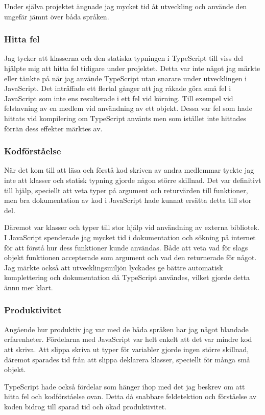 Under själva projektet ängnade jag mycket tid åt utveckling och använde den ungefär jämnt över båda språken.
\subsubsection{Hitta fel}
Jag tycker att klasserna och den statiska typningen i TypeScript till viss del hjälpte mig att hitta fel tidigare under projektet. Detta var inte något jag märkte eller tänkte på när jag använde TypeScript utan snarare under utvecklingen i JavaScript. Det inträffade ett flertal gånger att jag råkade göra små fel i JavaScript som inte ens resulterade i ett fel vid körning. Till exempel vid felstavning av en medlem vid användning av ett objekt. Dessa var fel som hade hittats vid kompilering om TypeScript använts men som istället inte hittades förrän dess effekter märktes av.
\subsubsection{Kodförståelse}
När det kom till att läsa och förstå kod skriven av andra medlemmar tyckte jag inte att klasser och statisk typning gjorde någon större skillnad. Det var definitivt till hjälp, speciellt att veta typer på argument och returvärden till funktioner, men bra dokumentation av kod i JavaScript hade kunnat ersätta detta till stor del.

Däremot var klasser och typer till stor hjälp vid användning av externa bibliotek. I JavaScript spenderade jag mycket tid i dokumentation och sökning på internet för att förstå hur dess funktioner kunde användas. Både att veta vad för slags objekt funktionen accepterade som argument och vad den returnerade för något. Jag märkte också att utvecklingsmiljön lyckades ge bättre automatisk komplettering och dokumentation då TypeScript användes, vilket gjorde detta ännu mer klart.
\subsubsection{Produktivitet}
Angående hur produktiv jag var med de båda språken har jag något blandade erfarenheter. Fördelarna med JavaScript var helt enkelt att det var mindre kod att skriva. Att slippa skriva ut typer för variabler gjorde ingen större skillnad, däremot sparades tid från att slippa deklarera klasser, speciellt för många små objekt.

TypeScript hade också fördelar som hänger ihop med det jag beskrev om att hitta fel och kodförståelse ovan. Detta då snabbare feldetektion och förståelse av koden bidrog till sparad tid och ökad produktivitet.
